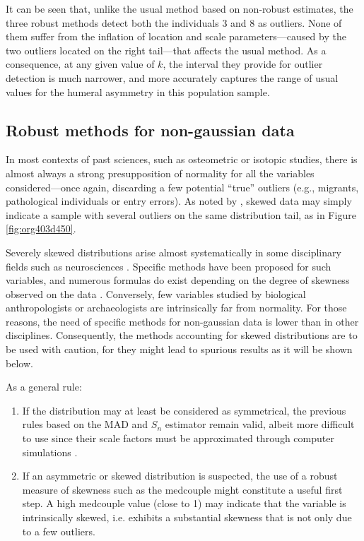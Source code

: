 \documentclass[review, 3p]{elsarticle}
\begin{document}
It can be seen that, unlike the usual method based on non-robust estimates, the three robust methods detect both the individuals 3 and 8 as outliers. None of them suffer from the inflation of location and scale parameters---caused by the two outliers located on the right tail---that affects the usual method. As a consequence, at any given value of \(k\), the interval they provide for outlier detection is much narrower, and more accurately captures the range of usual values for the humeral asymmetry in this population sample.

\subsection{Robust methods for non-gaussian data}
\label{sec:orgee27047}
In most contexts of past sciences, such as osteometric or isotopic studies, there is almost always a strong presupposition of normality for all the variables considered---once again, discarding a few potential ``true'' outliers (e.g., migrants, pathological individuals or entry errors). As noted by \citet[][p. 22]{lightfoot2016_UseBiomineralOxygen}, skewed data may simply indicate a sample with several outliers on the same distribution tail, as in Figure \ref{fig:org403d450}. 

Severely skewed distributions arise almost systematically in some disciplinary fields such as neurosciences \citep{rousselet2019_ReactionTimesOther}. Specific methods have been proposed for such variables, and numerous formulas do exist depending on the degree of skewness observed on the data \citep{hubert2008_AdjustedBoxplotSkewed}. Conversely, few variables studied by biological anthropologists or archaeologists are intrinsically far from normality. For those reasons, the need of specific methods for non-gaussian data is lower than in other disciplines. Consequently, the methods accounting for skewed distributions are to be used with caution, for they might lead to spurious results as it will be shown below.

As a general rule:
\begin{enumerate}
\item If the distribution may at least be considered as symmetrical, the previous rules based on the MAD and \(S_n\) estimator remain valid, albeit more difficult to use since their scale factors must be approximated through computer simulations \citep{rousseeuw1993_AlternativesMedianAbsolute}.
\item If an asymmetric or skewed distribution is suspected, the use of a robust measure of skewness such as the medcouple \citep{brys2004_RobustMeasureSkewness} might constitute a useful first step. A high medcouple value (close to 1) may indicate that the variable is intrinsically skewed, i.e. exhibits a substantial skewness that is not only due to a few outliers.
\end{enumerate}
\end{document}
